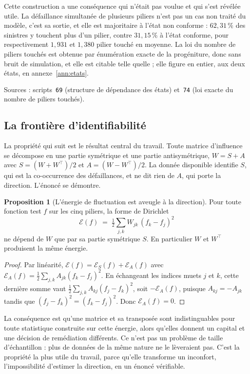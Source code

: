 \documentclass[12pt,a4paper]{article}
\theoremstyle{definition}
\newtheorem{proposition}{Proposition}
\begin{document}
Cette construction a une conséquence qui n'était pas voulue et qui s'est révélée
utile. La défaillance simultanée de plusieurs piliers n'est pas un cas non traité
du modèle, c'est sa sortie, et elle est majoritaire à l'état non conforme :
$62{,}31\,\%$ des sinistres y touchent plus d'un pilier, contre $31{,}15\,\%$ à
l'état conforme, pour respectivement $1{,}931$ et $1{,}380$ pilier touché en
moyenne. La loi du nombre de piliers touchés est obtenue par énumération exacte de
la progéniture, donc sans bruit de simulation, et elle est citable telle quelle ;
elle figure en entier, aux deux états, en annexe~\ref{ann:etats}.

\vspace{4pt}
\noindent Sources : scripts~\texttt{69} (structure de dépendance des états)
et~\texttt{74} (loi exacte du nombre de piliers touchés).

\subsection{La frontière d'identifiabilité}
\label{ss:identif}

La propriété qui suit est le résultat central du travail. Toute matrice
d'influence se décompose en une partie symétrique et une partie antisymétrique,
$W = S + A$ avec $S = (W + W^{\!\top})/2$ et $A = (W - W^{\!\top})/2$. La donnée
disponible identifie $S$, qui est la co-occurrence des défaillances, et ne dit
rien de $A$, qui porte la direction. L'énoncé se démontre.

\begin{proposition}[L'énergie de fluctuation est aveugle à la direction]
\label{prop:aveugle}
Pour toute fonction test $f$ sur les cinq piliers, la forme de Dirichlet
\[
  \mathcal{E}(f) \;=\; \tfrac12 \sum_{j,k} W_{jk}\,(f_k - f_j)^2
\]
ne dépend de $W$ que par sa partie symétrique $S$. En particulier $W$ et
$W^{\!\top}$ produisent la même énergie.
\end{proposition}

\begin{proof}
Par linéarité, $\mathcal{E}(f) = \mathcal{E}_S(f) + \mathcal{E}_A(f)$ avec
$\mathcal{E}_A(f) = \tfrac12 \sum_{j,k} A_{jk}(f_k - f_j)^2$. En échangeant les
indices muets $j$ et $k$, cette dernière somme vaut
$\tfrac12 \sum_{j,k} A_{kj}(f_j - f_k)^2$, soit $-\mathcal{E}_A(f)$, puisque
$A_{kj} = -A_{jk}$ tandis que $(f_j - f_k)^2 = (f_k - f_j)^2$. Donc
$\mathcal{E}_A(f) = 0$.
\end{proof}

La conséquence est qu'une matrice et sa transposée sont indistinguables pour toute
statistique construite sur cette énergie, alors qu'elles donnent un capital et une
décision de remédiation différents. Ce n'est pas un problème de taille
d'échantillon : plus de données de la même nature ne le lèveraient pas. C'est la
propriété la plus utile du travail, parce qu'elle transforme un inconfort,
l'impossibilité d'estimer la direction, en un énoncé vérifiable.
\end{document}
